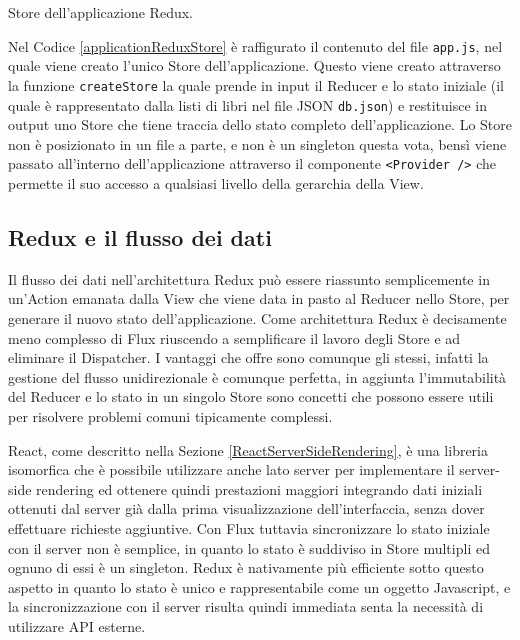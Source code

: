 \begin{listing}[ht]
\inputminted{javascript}{sources/applicationReduxStore.js}
\caption{Store dell'applicazione Redux.} 
\label{applicationReduxStore} 
\end{listing}

Nel Codice \ref{applicationReduxStore} è raffigurato il contenuto del file \texttt{app.js}, nel quale viene creato l'unico Store dell'applicazione. Questo viene creato attraverso
la funzione \texttt{createStore} la quale prende in input il Reducer e lo stato iniziale (il quale è rappresentato dalla listi di libri nel file JSON \texttt{db.json}) e restituisce in output uno Store che tiene traccia dello stato completo dell'applicazione.
Lo Store non è posizionato in un file a parte, e non è un singleton questa vota, bensì viene passato all'interno dell'applicazione attraverso il componente \texttt{<Provider />} che permette il suo accesso a qualsiasi livello della gerarchia della View.

\subsection{Redux e il flusso dei dati}
Il flusso dei dati nell'architettura Redux può essere riassunto semplicemente in un'Action emanata dalla View che viene data in pasto al Reducer nello Store, per generare il nuovo stato dell'applicazione.
Come architettura Redux è decisamente meno complesso di Flux riuscendo a semplificare il lavoro degli Store e ad eliminare il Dispatcher. I vantaggi che offre sono comunque gli stessi, infatti la gestione del flusso unidirezionale è comunque perfetta, in aggiunta l'immutabilità del Reducer e lo stato in un singolo Store sono concetti che possono essere utili per risolvere problemi comuni tipicamente complessi.

React, come descritto nella Sezione \ref{ReactServerSideRendering}, è una libreria isomorfica che è possibile utilizzare anche lato server per implementare il server-side rendering ed ottenere quindi prestazioni maggiori integrando dati iniziali ottenuti dal server già dalla prima visualizzazione dell'interfaccia, senza dover effettuare richieste aggiuntive. Con Flux tuttavia sincronizzare lo stato iniziale con il server non è semplice, in quanto lo stato è suddiviso in Store multipli ed ognuno di essi è un singleton. Redux è nativamente più efficiente sotto questo aspetto in quanto lo stato è unico e rappresentabile come un oggetto Javascript, e la sincronizzazione con il server risulta quindi immediata senta la necessità di utilizzare API esterne.

